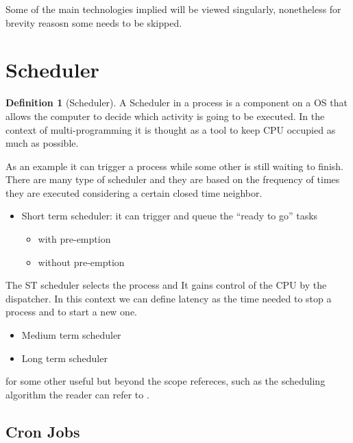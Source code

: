 \documentclass[
  12pt,
  a4paper,
  oneside]{book}
\providecommand{\tightlist}{%
  \setlength{\itemsep}{0pt}\setlength{\parskip}{0pt}}
\theoremstyle{definition}
\newtheorem{definition}{Definition}[chapter]
\theoremstyle{definition}
\theoremstyle{definition}
\theoremstyle{remark}
\begin{document}
Some of the main technologies implied will be viewed singularly, nonetheless for brevity reasosn some needs to be skipped.

\hypertarget{scheduler}{%
\section{Scheduler}\label{scheduler}}

\begin{definition}[Scheduler]
\protect\hypertarget{def:scheduler}{}{\label{def:scheduler} {} }A Scheduler in a process is a component on a OS that allows the computer to decide which activity is going to be executed. In the context of multi-programming it is thought as a tool to keep CPU occupied as much as possible.
\end{definition}

As an example it can trigger a process while some other is still waiting to finish. There are many type of scheduler and they are based on the frequency of times they are executed considering a certain closed time neighbor.

\begin{itemize}
\tightlist
\item
  Short term scheduler: it can trigger and queue the ``ready to go'' tasks

  \begin{itemize}
  \tightlist
  \item
    with pre-emption
  \item
    without pre-emption
  \end{itemize}
\end{itemize}

The ST scheduler selects the process and It gains control of the CPU by the dispatcher. In this context we can define latency as the time needed to stop a process and to start a new one.

\begin{itemize}
\tightlist
\item
  Medium term scheduler
\item
  Long term scheduler
\end{itemize}

for some other useful but beyond the scope refereces, such as the scheduling algorithm the reader can refer to \citep{wiki:scheduler}.

\hypertarget{cron-jobs}{%
\subsection{Cron Jobs}\label{cron-jobs}}
\end{document}
